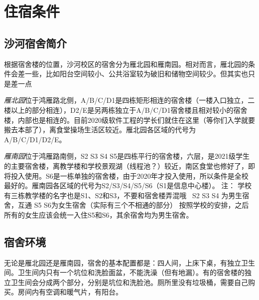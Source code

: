 \section{住宿条件}

\subsection*{沙河宿舍简介}

根据宿舍楼的位置，沙河校区的宿舍分为雁北园和雁南园。相对而言，雁北园的条件会差一些，比如阳台空间较小、公共浴室较为破旧和储物空间较少。但其实也只是差一点~

\emph{雁北园}位于鸿雁路北侧，A/B/C/D1是四栋矩形相连的宿舍楼（一楼入口独立，二楼以上的部分相连），D2/E是另两栋独立于A/B/C/D1宿舍楼且相对较小的宿舍楼，内部也是相连的。目前2020级软件工程的学长们就住在这里（等你们入学就要搬去本部了），离食堂操场生活区较近。雁北园各区域的代号为A/B/C/D1/D2/E。

\emph{雁南园}位于鸿雁路南侧，S2 S3 S4 S5是四栋平行的宿舍楼，六层，是2021级学生的主要宿舍楼，离教学楼和学校景观湖（线程池？）较近，南区食堂也修好了，即将投入使用。S6是一栋单独的宿舍楼，由于2020年才投入使用，所以条件是全校最好的。雁南园各区域的代号为S2/S3/S4/S5/S6（S1是信息中心楼）。
注：
学校有三栋教学楼的名字也是S1、S2和S3，不要和宿舍楼弄混哦~
S2 S3 S4 为男生宿舍，互通
S5 S6为女生宿舍（实际有三个不相通的部分）
按照学校的安排，之后所有的女生应该会统一入住S5和S6，其余宿舍均为男生宿舍。

\subsection*{宿舍环境}

无论是雁北园还是雁南园，宿舍的基本配置都是：四人间，上床下桌，有独立卫生间。卫生间内只有一个坑位和洗脸面盆，不能洗澡（但有地漏）。有的宿舍楼的独立卫生间会分成两个部分，分别是坑位和洗脸池。厕所里没有垃圾桶，需要自己购买。房间内有空调和暖气片，有阳台。


